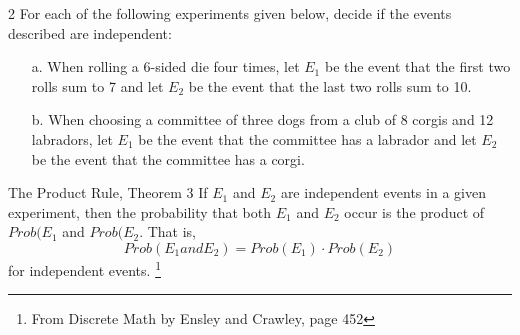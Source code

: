 \documentclass[a4paper,12pt]{book}
\newcounter{question}
\begin{document}
        
        \begin{question}{\thequestion}{2}
            For each of the following experiments given below,
            decide if the events described are independent:

            \begin{itemize}
                \item[a.] When rolling a 6-sided die four times, let $E_{1}$
                    be the event that the first two rolls sum to 7 and let $E_{2}$
                    be the event that the last two rolls sum to 10. ~\\

                \item[b.] When choosing a committee of three dogs from a club of
                    8 corgis and 12 labradors, let $E_{1}$ be the event that
                    the committee has a labrador and let $E_{2}$ be the
                    event that the committee has a corgi. ~\\
                
            \end{itemize}
        \end{question}

        
        \newpage{}
        \begin{intro}{The Product Rule, Theorem 3}
            If $E_{1}$ and $E_{2}$ are independent events in a given
            experiment, then the probability that both $E_{1}$ and $E_{2}$
            occur is the product of $Prob(E_{1}$ and $Prob(E_{2}$. That is,
            $$ Prob(E_{1} and E_{2}) = Prob(E_{1}) \cdot Prob(E_{2}) $$
            for independent events.
            \footnote{From Discrete Math by Ensley and Crawley, page 452}
        \end{intro}
\end{document}
